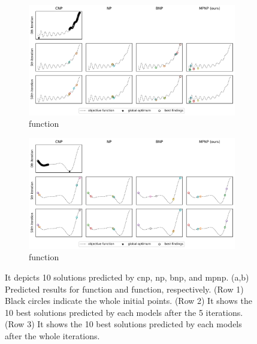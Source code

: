 \begin{figure}
\centering
\begin{subfigure}[b]{\textwidth}
\includegraphics[width=\linewidth]{figure/app_visualize_bo_gram_np.pdf}
\caption{\citet{gramacy2012cases} function}
\end{subfigure}
\bigskip

\begin{subfigure}[b]{\textwidth}
\includegraphics[width=\linewidth]{figure/app_visualize_bo_sob_np.pdf}
\caption{\citet{sobester2008engineering} function}
\end{subfigure}
\caption{It depicts 10 solutions predicted by \gls{cnp}, \gls{np}, \gls{bnp}, and \gls{mpnp}. (a,b) Predicted results for \citet{gramacy2012cases} function and \citet{sobester2008engineering} function, respectively. (Row 1) Black circles indicate the whole initial points. (Row 2) It shows the 10 best solutions predicted by each models after the 5 iterations. (Row 3) It shows the 10 best solutions predicted by each models after the whole iterations.}
\label{figure/app_visualize_bo_np}
\end{figure}

